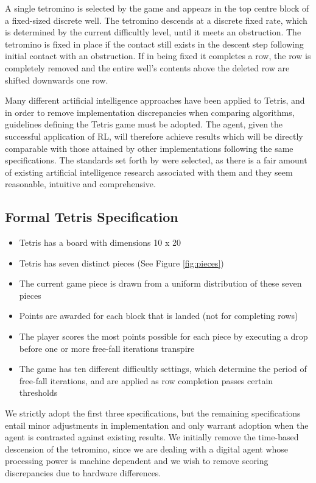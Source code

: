 \documentclass{rucsthesis}
\begin{document}
A  single tetromino is selected by the game and appears in the top centre block of a fixed-sized discrete well. The tetromino descends at a discrete fixed rate, which is determined by the current difficultly level, until it meets an obstruction. The tetromino is fixed in place if the contact still exists in the descent step following initial contact with an obstruction. If in being fixed it completes a row, the row is completely removed and the entire well's contents above the deleted row are shifted downwards one row.

Many different artificial intelligence approaches have been applied to Tetris, and in order to remove implementation discrepancies when comparing algorithms, guidelines defining the Tetris game must be adopted. The agent, given the successful application of RL, will therefore achieve results which will be directly comparable with those attained by other implementations following the same specifications. The standards set forth by \cite{tetstand} were selected, as there is a fair amount of existing artificial intelligence research associated with them and they seem reasonable, intuitive and comprehensive.

\subsection*{Formal Tetris Specification \citep{tetstand}} 
\begin{itemize}
\item{Tetris has a board with dimensions 10 x 20}
\item{Tetris has seven distinct pieces (See Figure \ref{fig:pieces})}
\item{The current game piece is drawn from a uniform distribution of these seven pieces}
\item{Points are awarded for each block that is landed (not for completing rows)}
\item{The player scores the most points possible for each piece by executing a drop before one or more free-fall iterations transpire}
\item{The game has ten different difficultly settings, which determine the period of free-fall iterations, and are applied as row completion passes certain thresholds}
\end{itemize}

We strictly adopt the first three specifications, but the remaining specifications entail minor adjustments in implementation and only warrant adoption when the agent is contrasted against existing results. We initially remove the time-based descension of the tetromino, since we are dealing with a digital agent whose processing power is machine dependent and we wish to remove scoring discrepancies due to hardware differences.
\end{document}

